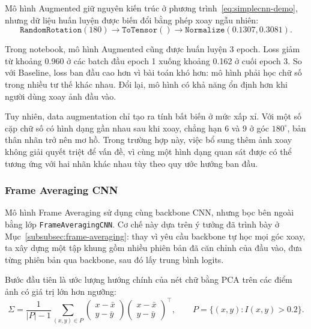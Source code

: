 Mô hình Augmented giữ nguyên kiến trúc ở phương trình~\eqref{eq:simplecnn-demo}, nhưng dữ liệu huấn luyện được biến đổi bằng phép xoay ngẫu nhiên:
\begin{equation}
    \texttt{RandomRotation}(180) \to \texttt{ToTensor}() \to \texttt{Normalize}(0.1307, 0.3081).
    \label{eq:mnist-augmentation-transform}
\end{equation}

Trong notebook, mô hình Augmented cũng được huấn luyện 3 epoch. Loss giảm từ khoảng 0.960 ở các batch đầu epoch 1 xuống khoảng 0.162 ở cuối epoch 3. So với Baseline, loss ban đầu cao hơn vì bài toán khó hơn: mô hình phải học chữ số trong nhiều tư thế khác nhau. Đổi lại, mô hình có khả năng ổn định hơn khi người dùng xoay ảnh đầu vào.

Tuy nhiên, data augmentation chỉ tạo ra tính bất biến ở mức xấp xỉ. Với một số cặp chữ số có hình dạng gần nhau sau khi xoay, chẳng hạn 6 và 9 ở góc $180^\circ$, bản thân nhãn trở nên mơ hồ. Trong trường hợp này, việc bổ sung thêm ảnh xoay không giải quyết triệt để vấn đề, vì cùng một hình dạng quan sát được có thể tương ứng với hai nhãn khác nhau tùy theo quy ước hướng ban đầu.

\subsubsection{Frame Averaging CNN}

Mô hình Frame Averaging sử dụng cùng backbone CNN, nhưng bọc bên ngoài bằng lớp \texttt{FrameAveragingCNN}. Cơ chế này dựa trên ý tưởng đã trình bày ở Mục~\ref{subsubsec:frame-averaging}: thay vì yêu cầu backbone tự học mọi góc xoay, ta xây dựng một tập khung gồm nhiều phiên bản đã căn chỉnh của đầu vào, đưa từng phiên bản qua backbone, sau đó lấy trung bình logits.

Bước đầu tiên là ước lượng hướng chính của nét chữ bằng PCA trên các điểm ảnh có giá trị lớn hơn ngưỡng:
\begin{equation}
    \Sigma = \frac{1}{|P|-1} \sum_{(x,y)\in P}
    \begin{pmatrix}x-\bar{x}\\y-\bar{y}\end{pmatrix}
    \begin{pmatrix}x-\bar{x}\\y-\bar{y}\end{pmatrix}^{\!\top},
    \qquad
    P = \{(x,y): I(x,y) > 0.2\}.
    \label{eq:mnist-pca-covariance}
\end{equation}

